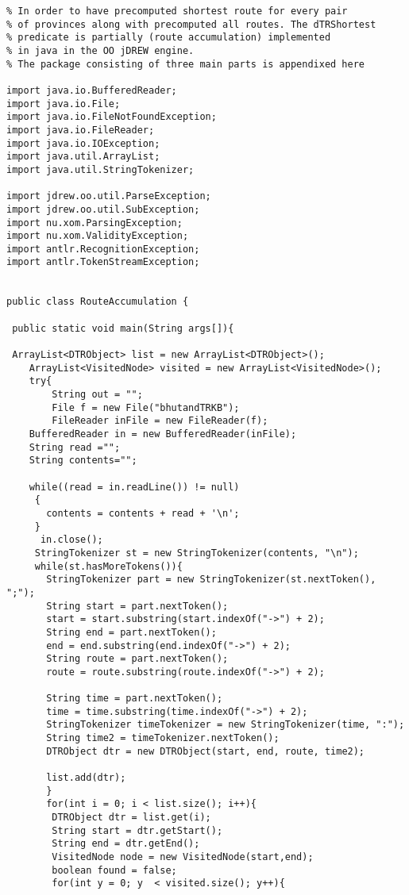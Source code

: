 \footnotesize
\begin{verbatim}
% In order to have precomputed shortest route for every pair 
% of provinces along with precomputed all routes. The dTRShortest 
% predicate is partially (route accumulation) implemented 
% in java in the OO jDREW engine.
% The package consisting of three main parts is appendixed here

import java.io.BufferedReader;
import java.io.File;
import java.io.FileNotFoundException;
import java.io.FileReader;
import java.io.IOException;
import java.util.ArrayList;
import java.util.StringTokenizer;

import jdrew.oo.util.ParseException;
import jdrew.oo.util.SubException;
import nu.xom.ParsingException;
import nu.xom.ValidityException;
import antlr.RecognitionException;
import antlr.TokenStreamException;


public class RouteAccumulation {

 public static void main(String args[]){
		
 ArrayList<DTRObject> list = new ArrayList<DTRObject>();
	ArrayList<VisitedNode> visited = new ArrayList<VisitedNode>();
	try{
		String out = "";
		File f = new File("bhutandTRKB");
		FileReader inFile = new FileReader(f);
    BufferedReader in = new BufferedReader(inFile);
    String read ="";
    String contents="";
         
    while((read = in.readLine()) != null)
     {
       contents = contents + read + '\n';
     }
      in.close();    
     StringTokenizer st = new StringTokenizer(contents, "\n");
     while(st.hasMoreTokens()){ 	 
       StringTokenizer part = new StringTokenizer(st.nextToken(), ";");
       String start = part.nextToken();
       start = start.substring(start.indexOf("->") + 2);
       String end = part.nextToken();
       end = end.substring(end.indexOf("->") + 2);
       String route = part.nextToken();
       route = route.substring(route.indexOf("->") + 2);
        	 
       String time = part.nextToken();
       time = time.substring(time.indexOf("->") + 2);
       StringTokenizer timeTokenizer = new StringTokenizer(time, ":");
       String time2 = timeTokenizer.nextToken();
       DTRObject dtr = new DTRObject(start, end, route, time2);
        	
       list.add(dtr);
       } 
       for(int i = 0; i < list.size(); i++){
        DTRObject dtr = list.get(i);
        String start = dtr.getStart();
        String end = dtr.getEnd();
        VisitedNode node = new VisitedNode(start,end);
        boolean found = false;
        for(int y = 0; y  < visited.size(); y++){
        		         		 

\end{verbatim}
